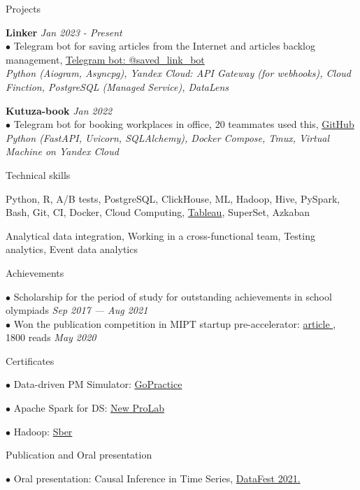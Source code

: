 \documentclass{resume} %
\begin{document}
\begin{rSection}{ Projects }

    { \bf Linker} \hfill {\em Jan 2023 - Present}\\
    { $\bullet$ Telegram bot for saving articles from the Internet and articles backlog management, \href{https://t.me/saved_link_bot}{Telegram bot: @saved\_link\_bot}}\\
    { \it Python (Aiogram, Asyncpg), Yandex Cloud: API Gateway (for webhooks), Cloud Finction, PostgreSQL (Managed Service), DataLens}

    { \bf Kutuza-book} \hfill {\em Jan 2022}\\
    { $\bullet$ Telegram bot for booking workplaces in office, 20 teammates used this, \href{https://github.com/YHx07/Kutuza-book}{GitHub}}\\
    { \it Python (FastAPI, Uvicorn, SQLAlchemy), Docker Compose, Tmux, Virtual Machine on Yandex Cloud }
    
\end{rSection}
    
\begin{rSection}{ Technical skills }
    
    Python, R, A/B tests, PostgreSQL, ClickHouse, ML, Hadoop, Hive, PySpark, Bash, Git, CI, Docker, Cloud Computing, \href{https://public.tableau.com/profile/dmitriy5983#!/}{Tableau}, SuperSet, Azkaban
    
    Analytical data integration, Working in a cross-functional team, Testing analytics, Event data analytics 

\end{rSection}

\begin{rSection}{ Achievements }

    { $\bullet$ Scholarship for the period of study for outstanding achievements in school olympiads } \hfill {\em Sep 2017 — Aug 2021}\\
    { $\bullet$ Won the publication competition in MIPT startup pre-accelerator: \href{https://vc.ru/tribuna/125433-kak-my-hoteli-pomoch-taksistam-no-pandemiya-vse-isportila}{ article }, 1800 reads }\hfill {\em May 2020}

\end{rSection}

\begin{rSection}{ Certificates }
    
    \begin{multicols}{2}[]
    
    $\bullet$ Data-driven PM Simulator: \href{https://gopractice.ru/course/pm/certificate/juqpip7o}{GoPractice}
    
    $\bullet$ Apache Spark for DS: \href{https://cloud.mail.ru/public/SQAS/RrvheyFmY}{New ProLab} 
    
    $\bullet$ Hadoop: \href{https://cloud.mail.ru/public/CH8T/6mMgjbRMZ}{Sber}
    
    \end{multicols}

\end{rSection}

\begin{rSection}{ Publication and Oral presentation }

    { $\bullet$ Oral presentation: Causal Inference in Time Series, \href{https://youtu.be/Yr6b8Rpy7Ds}{DataFest 2021. }}\\
    
\end{rSection}
\end{document}
